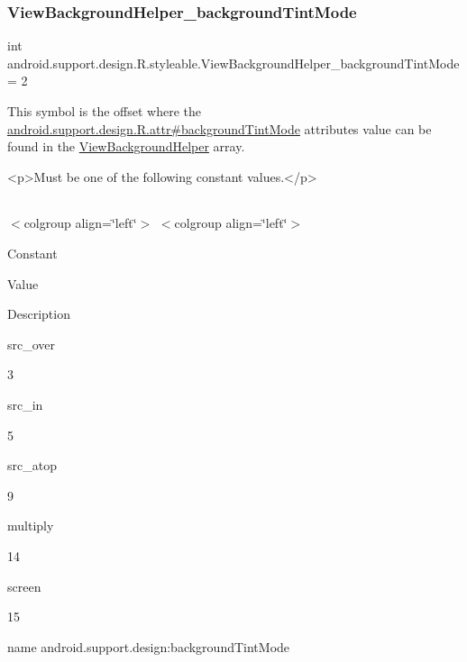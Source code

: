 \subsubsection{\texorpdfstring{View\+Background\+Helper\+\_\+background\+Tint\+Mode}{ViewBackgroundHelper\_backgroundTintMode}}
{\footnotesize\ttfamily int android.\+support.\+design.\+R.\+styleable.\+View\+Background\+Helper\+\_\+background\+Tint\+Mode = 2\hspace{0.3cm}{\ttfamily [static]}}

This symbol is the offset where the \hyperlink{classandroid_1_1support_1_1design_1_1R_1_1attr_a012eb62d26b9f9867a471ece462ff436}{android.\+support.\+design.\+R.\+attr\#background\+Tint\+Mode} attribute\textquotesingle{}s value can be found in the \hyperlink{classandroid_1_1support_1_1design_1_1R_1_1styleable_a7df8d9542168fb1f80021c7e5b776ddb}{View\+Background\+Helper} array.

\begin{DoxyVerb}      <p>Must be one of the following constant values.</p>
\end{DoxyVerb}
 \tabulinesep=1mm
\begin{longtabu} spread 0pt [c]{*{0}{|X[-1]}|}
\hline
\end{longtabu}
$<$colgroup align=\char`\"{}left\char`\"{}$>$ $<$colgroup align=\char`\"{}left\char`\"{}$>$ 

Constant

Value

Description 

{\ttfamily src\+\_\+over}

3

{\ttfamily src\+\_\+in}

5

{\ttfamily src\+\_\+atop}

9

{\ttfamily multiply}

14

{\ttfamily screen}

15

name android.\+support.\+design\+:background\+Tint\+Mode \mbox{\label{classandroid_1_1support_1_1design_1_1R_1_1styleable_a9d1ab53e5b97dd9ed9bd6109532344ef}} 
